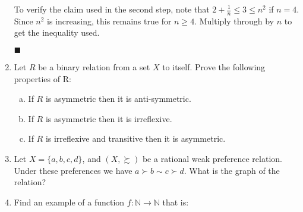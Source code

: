 \documentclass[12pt]{article}
\newif\ifsln
\newcommand{\N}{\mathbb{N}}
\newcommand{\halmos}{\hfill$\blacksquare$}
\begin{document}
\begin{enumerate}[1.]
To verify the claim used in the second step, note that $2 + \frac{1}{n} \leq 3 \leq n^{2}$ if $n = 4$. Since $n^{2}$ is increasing, this remains true for $n\geq 4$. Multiply through by $n$ to get the inequality used.

\halmos
\fi

\item Let $R$ be a binary relation from a set $X$ to itself. Prove the following properties of R:
\begin{enumerate}[a)]
	\item If $R$ is asymmetric then it is anti-symmetric.
	\item If $R$ is asymmetric then it is irreflexive.
	\item If $R$ is irreflexive and transitive then it is asymmetric.
\end{enumerate}

\ifsln
\textit{Solution}\\
a) Recall that anti-symmetry is $xRy \wedge yRx \implies x=y$. Asymmetry is $xRy \implies \neg yRx$. If a relation is asymmetric, then $xRy \wedge yRx$ is always false. Implication following from a false proposition is always true. Therefore asymmetry $\implies$ anti-symmetry.\medskip

b) Assume $R$ is not irreflexive. Then $\exists x$ s.t. $xRx$. By asymmetry, $xRx \implies \neg xRx$. Contradiction. So $R$ must be irreflexive.\medskip

c) Assume $R$ is not asymmetric. Then $\exists x, y \in X$ s.t. $xRy$ and $yRx$. By transitivity, $xRy \wedge yRx \implies xRx$. This contradicts irreflexivity, so $R$ must be asymmetric.

\fi 

\item Let $X = \{a, b, c, d\}$, and $(X, \succsim)$ be a rational weak preference relation. Under these preferences we have $a \succ b \sim c \succ d$. What is the graph of the relation?

\ifsln
\textit{Solution}\\
\[G = \{(a, a), (a, b), (a, c), (a, d), (b,b), (b, c), (b, d), (c, b), (c, c),  (c, d), (d,d)\}\]

\fi

\item Find an example of a function $f:\N \to \N$ that is:


\end{enumerate}
\end{document}
